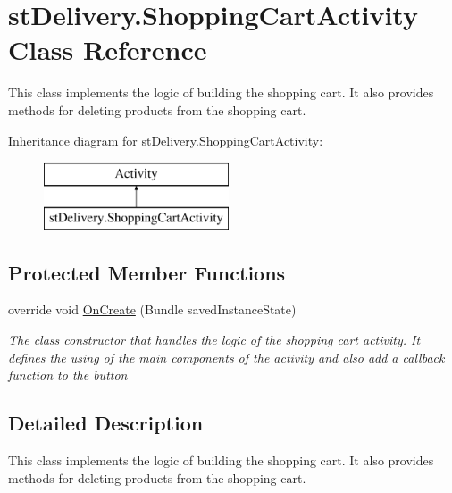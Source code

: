 \hypertarget{classst_delivery_1_1_shopping_cart_activity}{}\section{st\+Delivery.\+Shopping\+Cart\+Activity Class Reference}
\label{classst_delivery_1_1_shopping_cart_activity}


This class implements the logic of building the shopping cart. It also provides methods for deleting products from the shopping cart.  


Inheritance diagram for st\+Delivery.\+Shopping\+Cart\+Activity\+:\begin{figure}[H]
\begin{center}
\leavevmode
\includegraphics[height=2.000000cm]{classst_delivery_1_1_shopping_cart_activity}
\end{center}
\end{figure}
\subsection*{Protected Member Functions}
\begin{DoxyCompactItemize}
\item 
override void \hyperlink{classst_delivery_1_1_shopping_cart_activity_a4f3569f44a55df287d5ba1b967509abd}{On\+Create} (Bundle saved\+Instance\+State)
\begin{DoxyCompactList}\small\item\em The class constructor that handles the logic of the shopping cart activity. It defines the using of the main components of the activity and also add a callback function to the button \end{DoxyCompactList}\end{DoxyCompactItemize}


\subsection{Detailed Description}
This class implements the logic of building the shopping cart. It also provides methods for deleting products from the shopping cart. 



